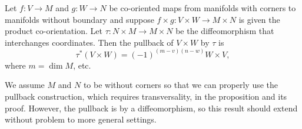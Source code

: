 \begin{proposition}\label{P: exterior commutativity}
	Let $f \colon V \to M$ and $g \colon W \to N$ be co-oriented maps from manifolds with corners to manifolds without boundary and suppose $f \times g \colon V \times W \to M \times N$ is given the product co-orientation.
	Let $\tau \colon N \times M \to M \times N$ be the diffeomorphism that interchanges coordinates.
	Then the pullback of $V \times W$ by $\tau$ is
	$$\tau^*(V \times W) = (-1)^{(m-v)(n-w)}W \times V,$$
	where $m = \dim M$, etc.
\end{proposition}
We assume $M$ and $N$ to be without corners so that we can properly use the pullback construction, which requires transversality, in the proposition and its proof.
However, the pullback is by a diffeomorphism, so this result should extend without problem to more general settings.
